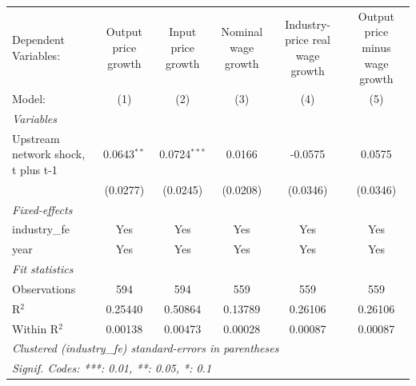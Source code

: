 \begingroup
\centering
\begin{tabular}{lccccc}
   \tabularnewline \midrule \midrule
   Dependent Variables:               & Output price growth & Input price growth & Nominal wage growth & Industry-price real wage growth & Output price minus wage growth\\  
   Model:                             & (1)                 & (2)                & (3)                 & (4)                             & (5)\\  
   \midrule
   \emph{Variables}\\
   Upstream network shock, t plus t-1 & 0.0643$^{**}$       & 0.0724$^{***}$     & 0.0166              & -0.0575                         & 0.0575\\   
                                      & (0.0277)            & (0.0245)           & (0.0208)            & (0.0346)                        & (0.0346)\\   
   \midrule
   \emph{Fixed-effects}\\
   industry\_fe                       & Yes                 & Yes                & Yes                 & Yes                             & Yes\\  
   year                               & Yes                 & Yes                & Yes                 & Yes                             & Yes\\  
   \midrule
   \emph{Fit statistics}\\
   Observations                       & 594                 & 594                & 559                 & 559                             & 559\\  
   R$^2$                              & 0.25440             & 0.50864            & 0.13789             & 0.26106                         & 0.26106\\  
   Within R$^2$                       & 0.00138             & 0.00473            & 0.00028             & 0.00087                         & 0.00087\\  
   \midrule \midrule
   \multicolumn{6}{l}{\emph{Clustered (industry\_fe) standard-errors in parentheses}}\\
   \multicolumn{6}{l}{\emph{Signif. Codes: ***: 0.01, **: 0.05, *: 0.1}}\\
\end{tabular}
\par\endgroup
